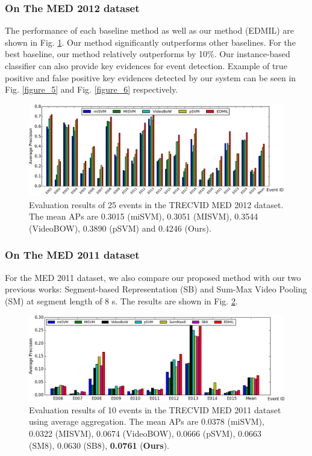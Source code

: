 \subsubsection{On The MED 2012 dataset}
The performance of each baseline method as well as our method (EDMIL) are shown in Fig. \ref{figure_4}. Our method significantly outperforms other baselines. For the best baseline, our method relatively outperforms by 10\%. Our instance-based classifier can also provide key evidences for event detection. Example of true positive and false positive key evidences detected by our system can be seen in Fig. \ref{figure_5} and Fig. \ref{figure_6} respectively. 

\begin{figure}
	\centering
	\includegraphics[width=1\textwidth]{figure_4.pdf}
	\caption{Evaluation results of 25 events in the TRECVID MED 2012 dataset. The mean APs are 0.3015 (miSVM), 0.3051 (MISVM), 0.3544 (VideoBOW), 0.3890 (pSVM) and 0.4246 (Ours).}
	\label{figure_4}
\end{figure}

\subsubsection{On The MED 2011 dataset}
For the MED 2011 dataset, we also compare our proposed method with our two previous works: Segment-based Representation (SB) and Sum-Max Video Pooling (SM) at segment length of 8 s. The results are shown in Fig. \ref{med11_sum}.

\begin{figure}
	\centering
	\includegraphics[width=1\textwidth]{med11_sum.png}
	\caption{Evaluation results of 10 events in the TRECVID MED 2011 dataset using average aggregation. The mean APs are 0.0378 (miSVM), 0.0322 (MISVM), 0.0674 (VideoBOW), 0.0666 (pSVM), 0.0663 (SM8), 0.0630 (SB8), \textbf{0.0761} (\textbf{Ours}).}
	\label{med11_sum}
\end{figure}

